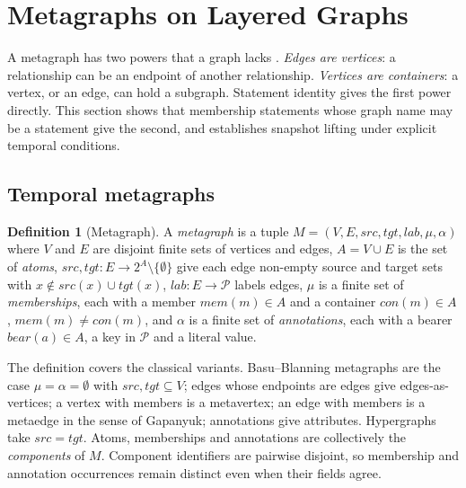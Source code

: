 \documentclass[11pt]{article}
\theoremstyle{plain}
\theoremstyle{definition}
\newtheorem{definition}{Definition}
\theoremstyle{remark}
\newcommand{\Pred}{\mathcal{P}}          %
\begin{document}
\section{Metagraphs on Layered Graphs}\label{sec:metagraph}

A metagraph has two powers that a graph lacks
\cite{basu2007metagraphs,chernenkiy2017rdf,gapanyuk2021development,pavlyshyn2026metagraph}.
\emph{Edges are vertices}: a relationship can be an endpoint of another
relationship. \emph{Vertices are containers}: a vertex, or an edge, can hold a
subgraph. Statement identity gives the first power directly. This section shows
that membership statements whose graph name may be a statement give the second,
and establishes snapshot lifting under explicit temporal conditions.

\subsection{Temporal metagraphs}

\begin{definition}[Metagraph]\label{def:metagraph}
A \emph{metagraph} is a tuple $M=(V,E,\mathit{src},\mathit{tgt},\mathit{lab},\mu,\alpha)$ where
$V$ and $E$ are disjoint finite sets of vertices and edges, $A=V\cup E$ is the
set of \emph{atoms}, $\mathit{src},\mathit{tgt}\colon E\to 2^{A}\setminus\{\emptyset\}$ give each edge
non-empty source and target sets with $x\notin\mathit{src}(x)\cup\mathit{tgt}(x)$, $\mathit{lab}\colon E\to\Pred$ labels
edges, $\mu$ is a finite set of \emph{memberships}, each with a member
$\mathit{mem}(m)\in A$ and a container $\mathit{con}(m)\in A$, $\mathit{mem}(m)\neq\mathit{con}(m)$, and $\alpha$ is a
finite set of \emph{annotations}, each with a bearer $\mathit{bear}(a)\in A$, a key in
$\Pred$ and a literal value.
\end{definition}

The definition covers the classical variants. Basu--Blanning metagraphs are the
case $\mu=\alpha=\emptyset$ with $\mathit{src},\mathit{tgt}\subseteq V$; edges whose endpoints are edges
give edges-as-vertices; a vertex with members is a metavertex; an edge with
members is a metaedge in the sense of Gapanyuk; annotations give attributes.
Hypergraphs take $\mathit{src}=\mathit{tgt}$. Atoms, memberships and annotations are collectively
the \emph{components} of $M$. Component identifiers are pairwise disjoint,
so membership and annotation occurrences remain distinct even when their fields agree.
\end{document}
